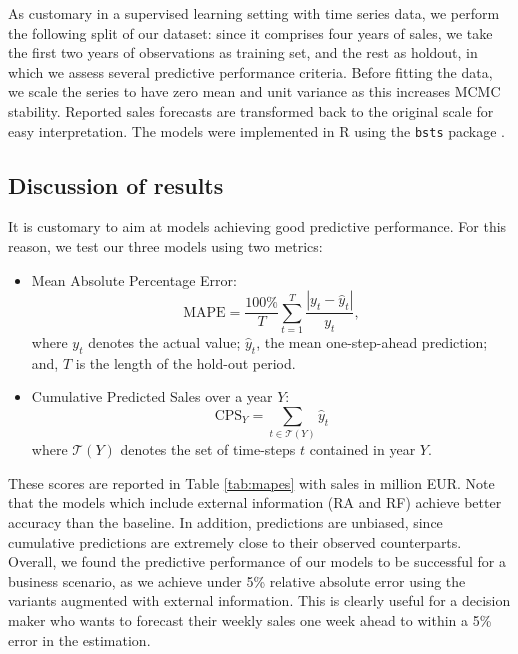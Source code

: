 As customary in a supervised learning setting with time series data, we perform the following split of our dataset: since it comprises four years of sales, we take the first two years of observations as training set, and the rest as holdout, in which we assess several predictive performance criteria. Before fitting the data, we scale the series to have zero mean and unit variance as this increases MCMC stability. Reported sales forecasts are transformed back to the original scale for easy interpretation. The models were implemented in R  using the \texttt{bsts} package \parencite{scott2016bsts}.




\subsection{Discussion of results}

It is customary to aim at models achieving good predictive performance. %
For this reason, we test  our three models using two metrics:

\begin{itemize}
\item Mean Absolute Percentage Error: $$ \text{MAPE} = \frac{100\%}{T}\sum_{t=1}^T \frac{|y_t - \hat{y}_t|}{y_t},$$
where $y_t$ denotes the actual value; $\hat{y}_t$, the mean one-step-ahead prediction; and, $T$ is the length of the hold-out period.
\item Cumulative Predicted Sales over a year $Y$:
$$
\text{CPS}_{Y} = \sum_{t \in \mathcal{T}(Y)} \hat{y}_t
$$
where $\mathcal{T}(Y)$ denotes the set of time-steps $t$ contained in year $Y$.
\end{itemize}
These scores are reported in Table \ref{tab:mapes} with sales in million EUR. Note that the models which include external information (RA and RF) achieve better accuracy than the baseline. In addition, 
predictions are unbiased, since cumulative predictions are extremely close to their observed counterparts. Overall, we found the predictive performance of our models to be successful for a business scenario, as we achieve under 5\% relative absolute error using the variants augmented with external information. This is clearly useful for a decision maker who wants to forecast their weekly sales one week ahead to within a 5\% error in the estimation.

